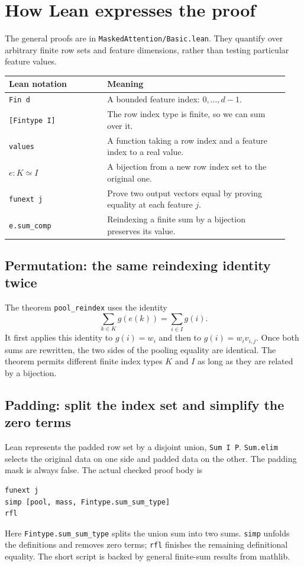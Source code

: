 \documentclass[11pt]{article}
\newcommand{\code}[1]{\nolinkurl{#1}}
\begin{document}
\newpage
\section{How Lean expresses the proof}
The general proofs are in \code{MaskedAttention/Basic.lean}. They quantify
over arbitrary finite row sets and feature dimensions, rather than testing
particular feature values.

\begin{center}
\begin{tabular}{@{}p{0.33\linewidth}p{0.61\linewidth}@{}}
\toprule
Lean notation & Meaning\\
\midrule
\texttt{Fin d} & A bounded feature index: $0,\ldots,d-1$.\\[4pt]
\texttt{[Fintype I]} & The row index type is finite, so we can sum over it.\\[4pt]
\code{values} & A function taking a row index and a feature index to a real value.\\[4pt]
$e:K\simeq I$ & A bijection from a new row index set to the original one.\\[4pt]
\texttt{funext j} & Prove two output vectors equal by proving equality at each feature $j$.\\[4pt]
\code{e.sum_comp} & Reindexing a finite sum by a bijection preserves its value.\\
\bottomrule
\end{tabular}
\end{center}

\subsection*{Permutation: the same reindexing identity twice}
The theorem \code{pool_reindex} uses the identity
\[
 \sum_{k\in K}g(e(k))=\sum_{i\in I}g(i).
\]
It first applies this identity to $g(i)=w_i$ and then to
$g(i)=w_i v_{i,j}$. Once both sums are rewritten, the two sides of the pooling
equality are identical. The theorem permits different finite index types
$K$ and $I$ as long as they are related by a bijection.

\subsection*{Padding: split the index set and simplify the zero terms}
Lean represents the padded row set by a disjoint union, \texttt{Sum I P}.
\code{Sum.elim} selects the original data on one side and padded data on the
other. The padding mask is always false. The actual checked proof body is
\begin{lstlisting}
funext j
simp [pool, mass, Fintype.sum_sum_type]
rfl
\end{lstlisting}
Here \code{Fintype.sum_sum_type} splits the union sum into two sums.
\code{simp} unfolds the definitions and removes zero terms; \code{rfl}
finishes the remaining definitional equality. The short script is backed
by general finite-sum results from mathlib.
\end{document}
